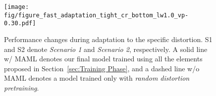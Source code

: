         \begin{table}[t]
        	\centering
        	\small
        	\tabcolsep=1mm
        	\caption{Performance and computational complexity of various models under \small\textit{Scenario 1}\normalsize. The reported performance is the average value for all kinds of distortions.}
        	\label{tbl:performance and complexity}
        	\vspace{-2mm}
        \end{table}
        
        \begin{figure}[t]
            \begin{center}
                \texttt{[image: fig/figure\_fast\_adaptation\_tight\_cr\_bottom\_lw1.0\_vp-0.30.pdf]}
            \end{center}
            \vspace{-6mm}
            \caption{Performance changes during adaptation to the specific distortion. S1 and S2 denote \small\textit{Scenario 1 }\normalsize and \small\textit{Scenario 2}\normalsize, respectively. A solid line w/ MAML denotes our final model trained using all the elements proposed in Section~\ref{sec:Training Phase}, and a dashed line w/o MAML denotes a model trained only with \textit{random distortion pretraining}.}
            \vspace{-1mm}
            \label{fig:fast_adaptation}
            \vspace{-2mm}
            \vspace{-2mm}
        \end{figure}

        \vspace{-4mm}
